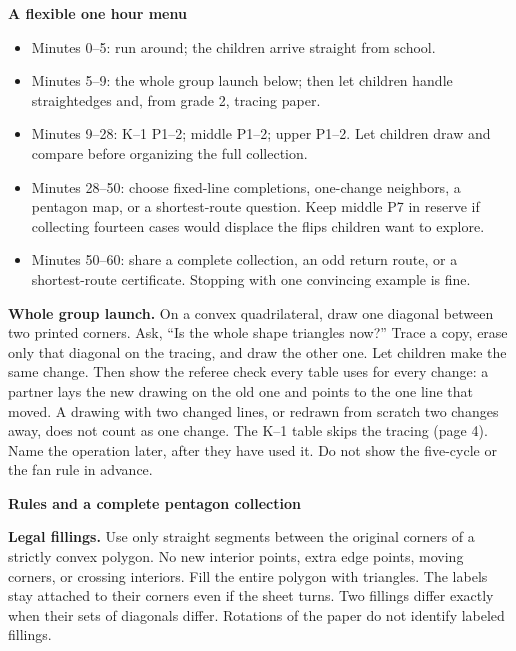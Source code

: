 \documentclass[11pt,letterpaper]{article}
\newcommand{\pagehead}[1]{{\Large\bfseries #1}\par\vspace{3pt}}
\begin{document}
\textbf{A flexible one hour menu}
\begin{itemize}
\item Minutes 0--5: run around; the children arrive straight from school.
\item Minutes 5--9: the whole group launch below; then let children handle straightedges and, from grade 2, tracing paper.
\item Minutes 9--28: K--1 P1--2; middle P1--2; upper P1--2. Let children draw and compare before organizing the full collection.
\item Minutes 28--50: choose fixed-line completions, one-change neighbors, a pentagon map, or a shortest-route question. Keep middle P7 in reserve if collecting fourteen cases would displace the flips children want to explore.
\item Minutes 50--60: share a complete collection, an odd return route, or a shortest-route certificate. Stopping with one convincing example is fine.
\end{itemize}
\textbf{Whole group launch.} On a convex quadrilateral, draw one diagonal between two printed corners. Ask, ``Is the whole shape triangles now?'' Trace a copy, erase only that diagonal on the tracing, and draw the other one. Let children make the same change. Then show the referee check every table uses for every change: a partner lays the new drawing on the old one and points to the one line that moved. A drawing with two changed lines, or redrawn from scratch two changes away, does not count as one change. The K--1 table skips the tracing (page 4). Name the operation later, after they have used it. Do not show the five-cycle or the fan rule in advance.

\newpage
\pagehead{Rules and a complete pentagon collection}
\textbf{Legal fillings.} Use only straight segments between the original corners of a strictly convex polygon. No new interior points, extra edge points, moving corners, or crossing interiors. Fill the entire polygon with triangles. The labels stay attached to their corners even if the sheet turns. Two fillings differ exactly when their sets of diagonals differ. Rotations of the paper do not identify labeled fillings.
\end{document}
